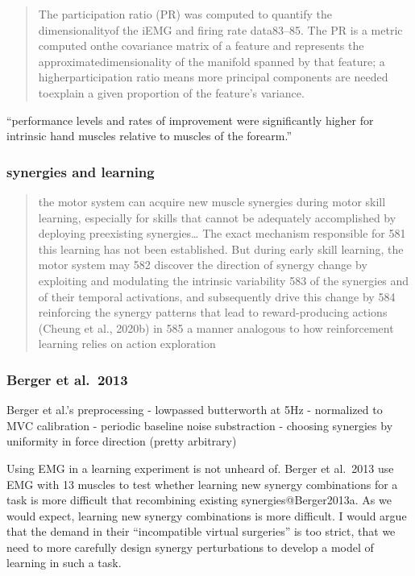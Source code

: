 \documentclass[../main.tex]{subfiles}
\begin{document}
\begin{quote}
The participation ratio (PR) was computed to quantify the dimensionalityof the iEMG and firing rate data83--85. The PR is a metric computed onthe covariance matrix of a feature and represents the approximatedimensionality of the manifold spanned by that feature; a higherparticipation ratio means more principal components are needed toexplain a given proportion of the feature's variance.
\end{quote}

``performance levels and rates of improvement were significantly higher for intrinsic hand muscles relative to muscles of the forearm.'' \cite{@Dyson2018}

\subsubsection{synergies and learning}\label{synergies-and-learning}

\begin{quote}
the motor system can acquire new muscle synergies during motor skill learning, especially for skills that cannot be adequately accomplished by deploying preexisting synergies\ldots{} The exact mechanism responsible for 581 this learning has not been established. But during early skill learning, the motor system may 582 discover the direction of synergy change by exploiting and modulating the intrinsic variability 583 of the synergies and of their temporal activations, and subsequently drive this change by 584 reinforcing the synergy patterns that lead to reward-producing actions (Cheung et al., 2020b) in 585 a manner analogous to how reinforcement learning relies on action exploration \cite{@cheungApproachesRevealingNeural2021}
\end{quote}

\subsubsection{Berger et al.~2013}\label{berger-et-al.-2013}

\cite{@BergerDifferencesInAdaptationRates2013a}

Berger et al.'s preprocessing - lowpassed butterworth at 5Hz - normalized to MVC calibration - periodic baseline noise substraction - choosing synergies by uniformity in force direction (pretty arbitrary)

Using EMG in a learning experiment is not unheard of. Berger et al.~2013 use EMG with 13 muscles to test whether learning new synergy combinations for a task is more difficult that recombining existing synergies@Berger2013a. As we would expect, learning new synergy combinations is more difficult. I would argue that the demand in their ``incompatible virtual surgeries'' is too strict, that we need to more carefully design synergy perturbations to develop a model of learning in such a task.
\end{document}
